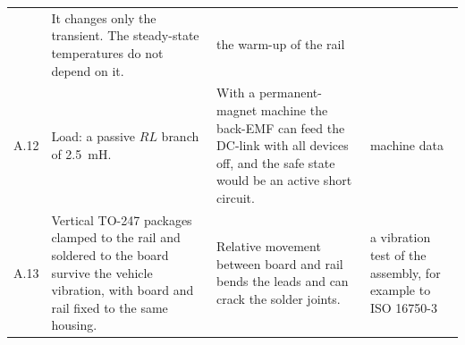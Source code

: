 {\begin{longtable}{L{0.05\textwidth}L{0.36\textwidth}L{0.30\textwidth}L{0.20\textwidth}}
    & It changes only the transient. The steady-state temperatures do not depend on it.
    & the warm-up of the rail \\
A.12 & Load: a passive $RL$ branch of \SI{2.5}{\milli\henry}.
    & With a permanent-magnet machine the back-EMF can feed the DC-link with all devices off, and the safe state would be an active short circuit.
    & machine data \\
A.13 & Vertical TO-247 packages clamped to the rail and soldered to the board survive the vehicle vibration, with board and rail fixed to the same housing.
    & Relative movement between board and rail bends the leads and can crack the solder joints.
    & a vibration test of the assembly, for example to ISO 16750-3 \\
\bottomrule
\end{longtable}
}
